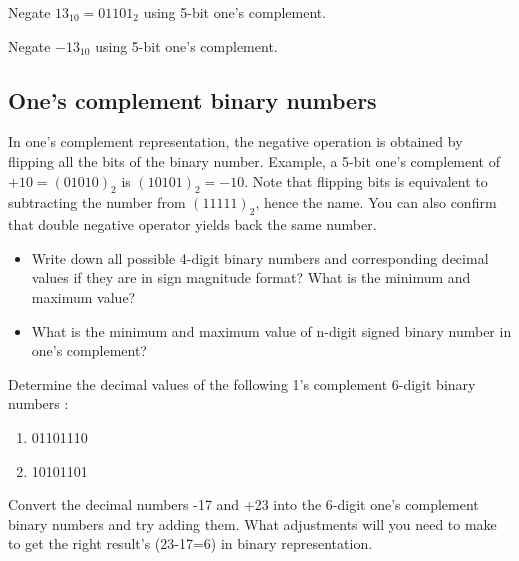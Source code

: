 \noindent Negate $13_{10} = 01101_2$ using 5-bit one's complement.
\vspace{10em}

\noindent Negate $-13_{10}$ using 5-bit one's complement.
\vspace{10em}

\subsection{One's complement binary numbers}

In one's complement representation, the negative operation is obtained by flipping
all the bits of the binary number. Example, a 5-bit one's
complement of $+10 = (01010)_2$ is $(10101)_2 = -10$. Note that flipping bits is
equivalent to subtracting the number from $(11111)_2$, hence the name. You can
also confirm that double negative operator yields back the same number.

\begin{prob}
  \begin{itemize}
  \item Write down all possible 4-digit binary numbers and corresponding decimal
    values if they are in sign magnitude format? What is the minimum and maximum value?
  \item What is the minimum and maximum value of n-digit signed binary number in
    one's complement?
  \end{itemize}
\end{prob}
\vspace{20em}

\begin{prob}
  Determine the decimal values of the following 1’s complement 6-digit binary numbers :
  \begin{enumerate}
  \item 01101110
  \item 10101101
  \end{enumerate}
\end{prob}
\vspace{20em}

\begin{prob}
  Convert the decimal numbers -17 and +23 into the 6-digit one's complement binary numbers and try adding them. What
  adjustments will you need to make to get the right result's (23-17=6) in binary representation.
\end{prob}
\vspace{20em}


